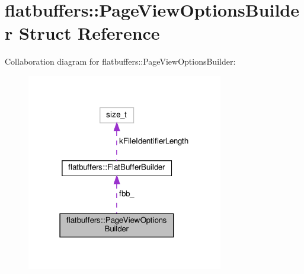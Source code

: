 \hypertarget{structflatbuffers_1_1PageViewOptionsBuilder}{}\section{flatbuffers\+:\+:Page\+View\+Options\+Builder Struct Reference}
\label{structflatbuffers_1_1PageViewOptionsBuilder}


Collaboration diagram for flatbuffers\+:\+:Page\+View\+Options\+Builder\+:
\nopagebreak
\begin{figure}[H]
\begin{center}
\leavevmode
\includegraphics[width=243pt]{structflatbuffers_1_1PageViewOptionsBuilder__coll__graph}
\end{center}
\end{figure}
